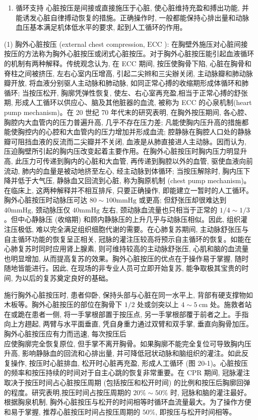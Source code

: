 \documentclass[10pt]{article}
\begin{document}
\begin{enumerate}
  \item 循环支持 心脏按压是间接或直接施压于心脏, 使心脏维持充盈和搏出功能, 并能诱发心脏自律搏动恢复的措施。正确操作时, 一般都能保持心排出量和动脉血压基本满足机体低水平的要求, 起到人工循环的作用。
\end{enumerate}

(1) 胸外心脏按压 (external chest compression, $\mathrm{ECC}$ ): 在胸壁外施压对心脏间接按压的方法称为胸外心脏按压或闭式心脏按压。对于胸外心脏按压能引起血液循环的机制有两种解释。传统观念认为, 在 ECC 期间, 按压使胸骨下陷, 心脏在胸骨和脊柱之间被挤压, 左右心室内压增高, 引起二尖辫和三尖辦关闭, 主动脉瓣和肺动脉瓣开放, 将血液分别驱人主动脉和肺动脉, 如同正常心搏的收缩期形成体循环和肺循环; 当按压松开, 胸廓凭弹性恢复, 使左、右心室再充盈,相当于正常心搏的舒张期, 形成人工循环以供应心、脑及其他脏器的血流, 被称为 ECC 的心泉机制(heart pump mechanism)。在 20 世纪 70 年代末的研究表明, 在胸外按压期间, 各心腔、胸腔内大血管内的压力普遍升高, 几乎不存在压力差; 凡能使胸内压升高的措施都能使胸控内的心腔和大血管内的压力增加并形成血流; 腔静脉在胸腔人口处的静脉瓣可阻挡血液的反流而二尖瓣并不关闭, 血液是从肺直接进人主动脉。因而认为, 压迫胸壁所引起的胸内压改变起着主要作用。在胸外心脏按压时胸内压力明显升高, 此压力可传递到胸内的心脏和大血管, 再传递到胸腔以外的血管, 驱使血液向前流动, 肺内的血量是被动地挤至左心, 经主动脉到体循环; 当按压解除时, 胸内压下降并低于大气压, 静脉血又回流到心脏, 称为胸原机制 (chest pump mechanism)。在临床上, 这两种解释并不相互排斥, 只要正确操作, 即能建立一暂时的人工循环。胸外心脏按压时动脉压可达 $80 \sim 100 \mathrm{mmHg}$ 或更高; 但舒张压却很难达到 $40 \mathrm{mmHg}$, 颈动脉压仅 $40 \mathrm{mmHg}$ 左右, 颈动脉血流量也只相当于正常的 $1 / 4 \sim 1 / 3$ 。但中心静脉压 (收缩期) 和顾内静脉压的上升几乎与动脉压相似。因此, 组织灌注压极低, 难以完全满足组织细胞代谢的需要。在心肺复苏期间, 主动脉舒张压与自主循环功能的恢复呈正相关, 冠脉的灌注压较高将预示自主循环的恢复。如能在心肺复苏时同时应用肾上腺素, 则可维持较高的主动脉舒张压, 心肌和脑的血流量也明显增加, 从而提高复苏的效果。胸外心脏按压的优点在于操作易于掌握, 随时随地皆能进行。因此, 在现场的非专业人员可立即开始复苏, 能争取极其宝贵的时间, 为以后的复苏奠定良好的基础。

施行胸外心脏按压时, 患者仰卧, 保持头部与心脏在同一水平上, 背部有硬支撑物如木板等。胸外心脏按压的部位在胸骨下 $1 / 2$ 处或剑突以上 $4 \sim 5 \mathrm{~cm}$ 处。施救者站在或跪在患者一侧, 将一手掌根部置于按压点, 另一手掌根部覆于前者之上。手指向上方趐起, 两臂与水平面垂直, 凭自身重力通过双臂和双手掌, 垂直向胸骨加压。胸外心脏按压应有力而迅速, 每次按压后\\
应使胸廓完全恢复原位, 但手掌不离开胸骨。如果胸廓不能完全复位可导致胸内压升高, 影响静脉血的回流和心排出量, 并可降低冠状动脉和脑组织的灌注。如此反复操作, 按压时心脏排血, 松开时心脏再充盈, 形成人工循环 (图 20-1)。心脏按压的频率和按压持续的时间对于自主心跳的恢复非常重要。在 CPR 期间, 冠脉灌注取决于按压时间占心脏按压周期 (包括按压和松开时间) 的比例和按压后胸廓回弹的程度。研究表明,按压时间占按压周期的 $20 \% \sim 50 \%$ 时, 冠脉和脑的灌注最好。根据胸泉机制, 胸外心脏按压与松开的时间相等时循环血流量最大。为了操作方便和易于掌握, 推荐心脏按压时间占按压周期的 $50 \%$, 即按压与松开时间相等。
\end{document}
